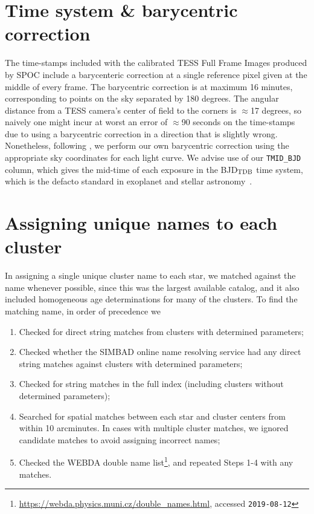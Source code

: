 \documentclass[12pt,twocolumn,tighten]{aastex62}
\begin{document}
\clearpage
\newpage

                            
 

\appendix
\section{Time system \& barycentric correction}
\label{appendix:time}

The time-stamps included with the calibrated TESS Full Frame Images
produced by SPOC include a barycenteric correction at
a single reference pixel given at the middle of every frame.
The barycentric correction is at maximum 16 minutes, corresponding to
points on the sky separated by 180 degrees.
The angular distance from a TESS camera's center of field to the corners
is $\approx$17 degrees, so naively one might incur at worst an error of
$\approx$90 seconds on the time-stamps due to using a barycentric
correction in a direction that is slightly wrong.
Nonetheless, following
\citet{bouma_wasp-4b_2019},
we perform our own barycentric correction using the appropriate
sky coordinates for each light curve.
We advise use of our \texttt{TMID\_BJD} column, which gives the
mid-time of each exposure in the BJD$_{\rm TDB}$ time system, which
is the defacto standard in exoplanet and stellar
astronomy~\citep{eastman_achieving_2010}.

\section{Assigning unique names to each cluster}
\label{appendix:uniquenames}

In assigning a single unique cluster name to each star, we matched
against the \citet{Kharchenko_et_al_2013} name whenever possible,
since this was the largest available catalog, and it also included
homogeneous age determinations for many of the clusters.
To find the matching name, in order of precedence we
\begin{enumerate}
  \item Checked for direct string matches from
    \citet{Kharchenko_et_al_2013} clusters with determined parameters;
  \item Checked whether the SIMBAD online name resolving service \citep{wenger_simbad_2000} had
    any direct string matches against \citet{Kharchenko_et_al_2013}
    clusters with determined parameters;
  \item Checked for string matches in the full
    \citet{Kharchenko_et_al_2013} index (including clusters without
    determined parameters);
  \item Searched for spatial matches between each star and cluster
    centers from \citet{Kharchenko_et_al_2013} within 10 arcminutes.
    In cases with multiple cluster matches, we ignored candidate
    matches to avoid assigning incorrect names;
  \item Checked the WEBDA double name
    list\footnote{\url{https://webda.physics.muni.cz/double_names.html}, accessed \texttt{2019-08-12}},
    and repeated Steps 1-4 with any matches.
\end{enumerate}
\end{document}
